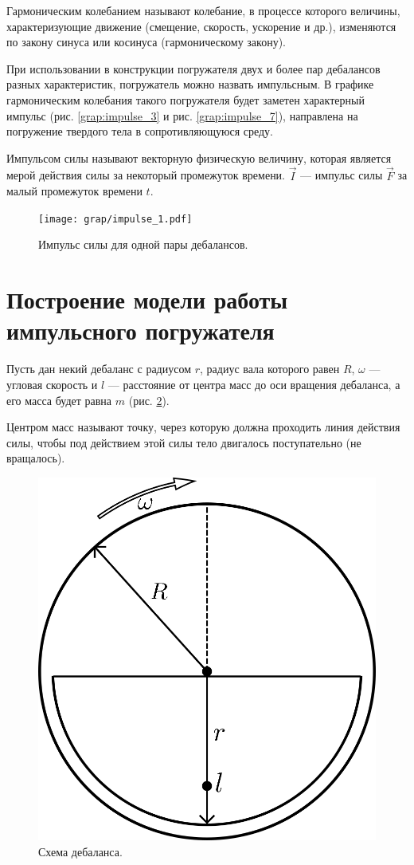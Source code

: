 \begin{definition}
    Гармоническим колебанием называют колебание, в процессе которого величины, характеризующие движение (смещение, скорость, ускорение и др.),
    изменяются по закону синуса или косинуса (гармоническому закону).
\end{definition}

При использовании в конструкции погружателя двух и более пар дебалансов разных характеристик, погружатель можно назвать импульсным.
В графике гармоническим колебания такого погружателя будет заметен характерный импульс (рис. \ref{grap:impulse_3} и рис. \ref{grap:impulse_7}),
направлена на погружение твердого тела в сопротивляющуюся среду.

\begin{definition}
    Импульсом силы называют векторную физическую величину, которая является мерой действия силы за некоторый промежуток времени.
    $\vec{I}$ --- импульс силы $\vec{F}$ за малый промежуток времени $t$.
\end{definition}

\begin{figure}[h]
    \centering
    \texttt{[image: grap/impulse\_1.pdf]}
    \caption{Импульс силы для одной пары дебалансов.}
    \label{grap:impulse_1}
\end{figure}


\clearpage
\section{Построение модели работы импульсного погружателя}
\label{chapter:model}

Пусть дан некий дебаланс с радиусом $r$, радиус вала которого равен $R$,
$\omega$ --- угловая скорость и $l$ --- расстояние от центра масс до оси вращения дебаланса, а его масса будет равна $m$ (рис. \ref{fig:debalance}). 

\begin{definition}
    Центром масс называют точку, через которую должна проходить линия действия силы, чтобы под действием этой силы тело двигалось поступательно (не вращалось).
\end{definition}

\begin{figure}[h]
    \centering
    \includegraphics[width=0.4\linewidth]{img/debalance.png}
    \caption{Схема дебаланса.}
    \label{fig:debalance}
\end{figure}

